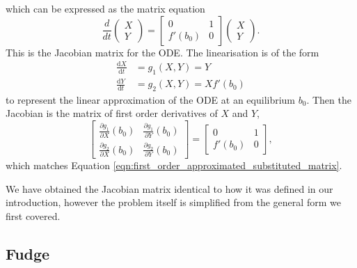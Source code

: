 \documentclass{report}
\begin{document}
which can be expressed as the matrix equation
\begin{equation}
    \frac{d}{dt}\begin{pmatrix}
        X \\
        Y
    \end{pmatrix} = \begin{bmatrix}
        0      & 1 \\
        f'(b_0) & 0
    \end{bmatrix} \begin{pmatrix}
        X \\
        Y
    \end{pmatrix}.
    \label{eqn:first_order_approximated_substituted_matrix}
\end{equation}
This is the Jacobian matrix for the ODE. The linearisation is of the form
\begin{align*}
    \frac{\mathrm{d}X}{\mathrm{d}t} &= g_1(X,Y) = Y \\
    \frac{\mathrm{d}Y}{\mathrm{d}t} &= g_2(X,Y) = Xf'(b_0) 
\end{align*}
to represent the linear approximation of the ODE at an equilibrium \(b_0\).
Then the Jacobian is the matrix of first order derivatives of $X$ and $Y$,
\begin{equation}
    \begin{bmatrix}
        \frac{\partial g_1}{\partial X}(b_0) & \frac{\partial g_1}{\partial Y}(b_0) \\
        \frac{\partial g_2}{\partial X}(b_0) & \frac{\partial g_2}{\partial Y}(b_0) 
    \end{bmatrix} = \begin{bmatrix}
        0 & 1 \\
        f'(b_0) & 0
    \end{bmatrix},
\end{equation}
which matches Equation \ref{eqn:first_order_approximated_substituted_matrix}.

We have obtained the Jacobian matrix identical to how it was defined in our introduction,
however the problem itself is simplified from the general form we first covered.



\subsection{Fudge}
\end{document}
